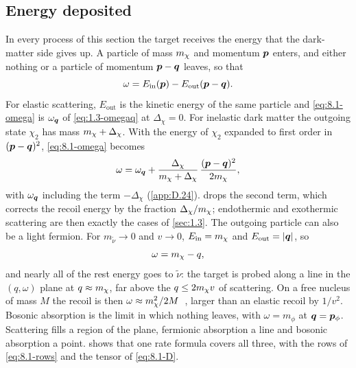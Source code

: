 \subsection{Energy deposited}\label{sec:8.1-kinematics}

In every process of this section the target receives the energy that the dark-matter side gives up. A particle of mass $m_{\chi}$ and momentum $\bm{p}$ enters, and either nothing or a particle of momentum $\bm{p} - \bm{q}$ leaves, so that
\begin{equation}
  \omega = E_{\mathrm{in}}(\bm{p}) - E_{\mathrm{out}}(\bm{p} - \bm{q}) .
  \label{eq:8.1-omega}
\end{equation}
For elastic scattering, $E_{\mathrm{out}}$ is the kinetic energy of the same particle and \cref{eq:8.1-omega} is $\omega_{\bm{q}}$ of \cref{eq:1.3-omegaq} at $\Delta_\chi = 0$. For inelastic dark matter the outgoing state $\chi_2$ has mass $m_{\chi} + \Delta_\chi$. With the energy of $\chi_2$ expanded to first order in $(\bm{p} - \bm{q})^2$, \cref{eq:8.1-omega} becomes
\begin{equation}
  \omega = \omega_{\bm{q}} + \frac{\Delta_\chi}{m_{\chi} + \Delta_\chi}\,\frac{(\bm{p} - \bm{q})^2}{2m_{\chi}} ,
  \label{eq:8.1-omega-inel}
\end{equation}
with $\omega_{\bm{q}}$ including the term $-\Delta_\chi$ (\cref{app:D.24}).  drops the second term, which corrects the recoil energy by the fraction $\Delta_\chi/m_{\chi}$; endothermic and exothermic scattering are then exactly the cases of \cref{sec:1.3}. The outgoing particle can also be a light fermion. For $m_{\tilde\nu} \to 0$ and $v \to 0$, $E_{\mathrm{in}} = m_{\chi}$ and $E_{\mathrm{out}} = |\bm{q}|$, so
\begin{equation}
  \omega = m_{\chi} - q ,
  \label{eq:8.1-omega-ferm}
\end{equation}
and nearly all of the rest energy goes to $\tilde\nu$: the target is probed along a line in the $(q, \omega)$ plane at $q \approx m_{\chi}$, far above the $q \le 2m_{\chi} v$ of scattering. On a free nucleus of mass $M$ the recoil is then $\omega \approx m_{\chi}^2/2M$~\cite[Eq.~(2)]{dror2020direct}, larger than an elastic recoil by $1/v^2$. Bosonic absorption is the limit in which nothing leaves, with $\omega = m_\phi$ at $\bm{q} = \bm{p}_\phi$. Scattering fills a region of the plane, fermionic absorption a line and bosonic absorption a point.  shows that one rate formula covers all three, with the rows of \cref{eq:8.1-rows} and the tensor of \cref{eq:8.1-D}.
